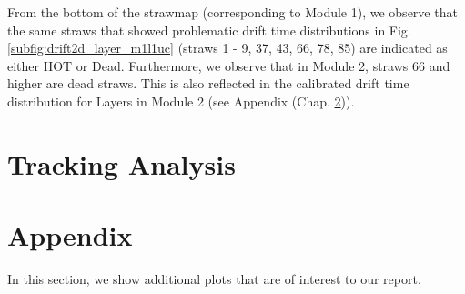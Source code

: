 \documentclass[a4paper]{report}
\numberwithin{equation}{section}
\begin{document}
From the bottom of the strawmap (corresponding to Module 1), we observe that the same straws that showed problematic drift time distributions
in Fig. \ref{subfig:drift2d_layer_m1l1uc} (straws 1 - 9, 37, 43, 66, 78, 85) are indicated as either HOT or Dead. Furthermore, 
we observe that in Module 2, straws 66 and higher are dead straws. This is also reflected in the calibrated drift time distribution 
for Layers in Module 2 (see Appendix (Chap. \ref{chap:appendix})). \par 

\chapter{Tracking Analysis} \label{chap:track_analysis}






\printbibliography

\chapter{Appendix} \label{chap:appendix}

In this section, we show additional plots that are of interest to our report.\par 
\end{document}
